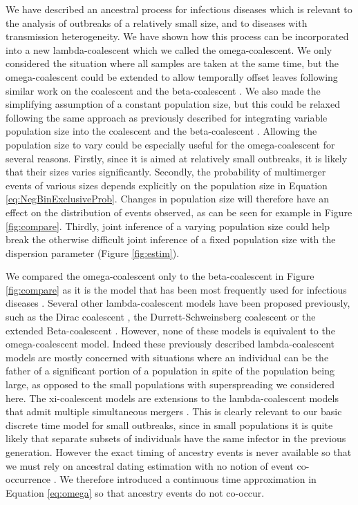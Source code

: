 \documentclass{article}
\renewcommand{\eqref}[1]{\ref{#1}}
\begin{document}
We have described an ancestral process for infectious diseases
which is relevant to the analysis of outbreaks of a relatively small size,
and to diseases with transmission heterogeneity.
We have shown how this process can be incorporated into a new lambda-coalescent
which we called the omega-coalescent. We only considered the
situation where all samples are taken at the same time, but
the omega-coalescent could be extended to allow temporally offset leaves 
following similar work on the coalescent \citep{Drummond2003} and the beta-coalescent \citep{Hoscheit2019}.
We also made the simplifying assumption of a constant population size,
but this could be relaxed 
following the same approach as previously described for integrating variable population size into
the coalescent \citep{Griffiths1994,Pybus2000,Ho2011skylinereview} and the beta-coalescent \citep{Hoscheit2019,zhangMultipleMergerCoalescent2024}.
Allowing the population size to vary could be especially useful for the omega-coalescent
for several reasons. Firstly, since it is aimed at relatively small outbreaks, it is likely that
their sizes varies significantly. Secondly, 
the probability of multimerger events of various sizes
depends explicitly on the population size in Equation \eqref{eq:NegBinExclusiveProb}.
Changes in population size will therefore have an effect on the distribution of
events observed, as can be seen for example in Figure \ref{fig:compare}.
Thirdly, joint inference of a varying population size could help break the otherwise
difficult joint inference of a fixed population size with the dispersion parameter 
(Figure \ref{fig:estim}).

We compared the omega-coalescent only to the beta-coalescent \citep{schweinsbergCoalescentProcessesObtained2003} in Figure \ref{fig:compare}
as it is the model that has been most frequently used for infectious diseases
\citep{Hoscheit2019,Menardo2021,Helekal2024}.
Several other lambda-coalescent models have been proposed previously, such as 
the Dirac coalescent \citep{eldonCoalescentProcessesWhen2006},
the Durrett-Schweinsberg coalescent \citep{Durrett2005a} or the
extended Beta-coalescent \citep{Helekal2024}. However, none of these models
is equivalent to the omega-coalescent model. Indeed these previously
described lambda-coalescent models are mostly
concerned with situations where an individual can be the father of a significant
portion of a population in spite of the population being large, as opposed to the 
small populations with superspreading we considered here.
The xi-coalescent models are extensions to the lambda-coalescent models that admit multiple 
simultaneous mergers \citep{schweinsbergCoalescentsSimultaneousMultiple2000}.
This is clearly relevant to our basic discrete time model for small outbreaks,
since in small populations it is quite likely that separate subsets of individuals
have the same infector in the previous generation. 
However the exact timing of ancestry events is never available so that we
must rely on ancestral dating estimation with no notion of event
co-occurrence \citep{Volz2017,Didelot2018,Bouckaert2019,Helekal2024}. 
We therefore introduced a 
continuous time approximation in Equation \ref{eq:omega} so that ancestry events 
do not co-occur. 
\end{document}

